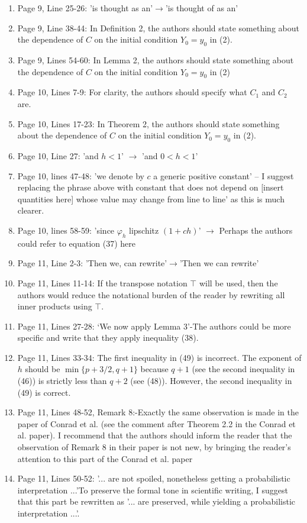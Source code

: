 \documentclass{article}
\begin{document}
\begin{enumerate}[label=(\arabic*)]
		\item Page 9, Line 25-26: 'is thought as an'$\to$'is thought of as an'
		\item Page 9, Line 38-44: In Definition 2, the authors should state something about the dependence of $C$ on the initial condition $Y_0=y_0$ in (2).
		\item Page 9, Lines 54-60: In Lemma 2, the authors should state something about the dependence of $C$ on the initial condition $Y_0=y_0$ in (2)
		\item Page 10, Lines 7-9: For clarity, the authors should specify what $C_1$ and $C_2$ are.
		\item Page 10, Lines 17-23: In Theorem 2, the authors should state something about the dependence of $C$ on the initial condition $Y_0=y_0$ in (2).
		\item Page 10, Line 27: 'and $h<1$' $\to$ 'and $0<h<1$'
		\item Page 10, lines 47-48: 'we denote by $c$ a generic positive constant' -- I suggest replacing the phrase above with constant that does not depend on [insert quantities here] whose value may change from line to line' as this is much clearer.
		\item Page 10, lines 58-59: 'since $\varphi_h$ lipschitz $(1+ch)$' $\to$ Perhaps the authors could refer to equation (37) here
		\item Page 11, Line 2-3: 'Then we, can rewrite'$\to$'Then we can rewrite'
		\item Page 11, Lines 11-14: If the transpose notation $\top$ will be used, then the authors would reduce the notational burden of the reader by rewriting all inner products using $\top$.
		\item Page 11, Lines 27-28: `We now apply Lemma 3'-The authors could be more specific and write that they apply inequality (38).
		\item Page 11, Lines 33-34: The first inequality in (49) is incorrect. The exponent of $h$ should be $\min\{p+3/2,q+1\}$ because $q+1$ (see the second inequality in (46)) is strictly less than $q+2$ (see (48)). However, the second inequality in (49) is correct.
		\item Page 11, Lines 48-52, Remark 8:-Exactly the same observation is made in the paper of Conrad et al. (see the comment after Theorem 2.2 in the Conrad et al. paper). I recommend that the authors should inform the reader that the observation of Remark 8 in their paper is not new, by bringing the reader's attention to this part of the Conrad et al. paper
		\item Page 11, Lines 50-52: '... are not spoiled, nonetheless getting a probabilistic interpretation ...'To preserve the formal tone in scientific writing, I suggest that this part be rewritten as '... are preserved, while yielding a probabilistic interpretation ...'.

\end{enumerate}
\end{document}
